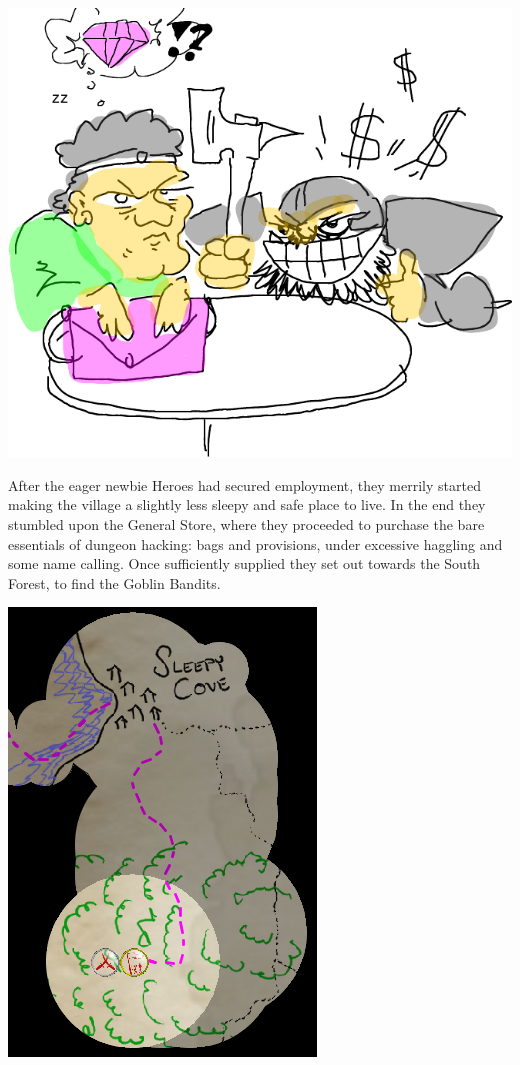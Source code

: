 \begin{center}
\vspace{0.5 cm}
\includegraphics[width=0.7\linewidth]{./figs/playthrough/negotiate.png}
\vspace{0.5 cm}
\end{center}

After the eager newbie Heroes had secured employment, they merrily started making the village a slightly less sleepy and safe place to live. In the end they stumbled upon the General Store, where they proceeded to purchase the bare essentials of dungeon hacking: bags and provisions, under excessive haggling and some name calling. Once sufficiently supplied they set out towards the South Forest, to find the Goblin Bandits.

\begin{center}
\vspace{0.5 cm}
\includegraphics[width=0.4\linewidth]{./figs/playthrough/travel-goblins.png}
\vspace{0.5 cm}
\end{center}

